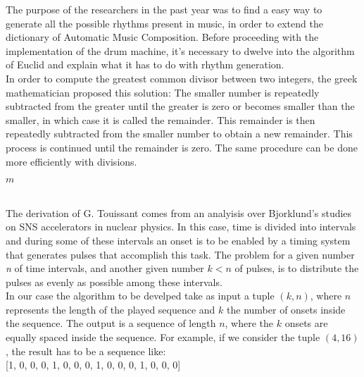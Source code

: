 \documentclass[main.tex]{subfiles}
\begin{document}
The purpose of the researchers in the past year was to find a easy way to generate all the possible rhythms present in music, in order to extend the dictionary of Automatic Music Composition\cite{Allouche:2002:AutomSeq:book}.
Before proceeding with the implementation of the drum machine, it’s necessary to dwelve into the algorithm of Euclid and explain what it has to do with rhythm generation.\\
In order to compute the greatest common divisor between two integers, the greek mathematician proposed this solution:
The smaller number is repeatedly subtracted from the greater until the greater is zero or becomes smaller than the smaller, in which case it is called the remainder. This remainder is then repeatedly subtracted from the smaller number to obtain a new remainder. This process is continued until the remainder is zero\cite{Euclid:Elements}. 
The same procedure can be done more efficiently with divisions.\\
[2mm]
\begin{algorithm}
\label{euclid}
\begin{algorithmic}[1]
\State \Return $m$
\Else
\State {}

\EndIf
\EndProcedure
\end{algorithmic}
\end{algorithm}\\
[3mm]
The derivation of G. Touissant\cite{Toussaint:2004:euclidean:rhythm} comes from an analyisis over Bjorklund's studies on SNS accelerators\cite{Bjorklund:2004:euclidean:rhythm} in nuclear physics. In this case, time is divided into intervals and during some of these intervals an onset is to be enabled by a timing system that generates pulses that accomplish this task. The problem for a given number \textit{n} of time intervals, and another given number \begin{math}k<n\end{math} of pulses, is to distribute the pulses as evenly as possible among these intervals.\\
In our case the algorithm to be develped take as input a tuple \begin{math}{(k, n)}\end{math}, where \begin{math}{n}\end{math} represents the length of the played sequence and \begin{math}{k}\end{math} the number of onsets inside the sequence. The output is a sequence of length \begin{math}{n}\end{math}, where the \begin{math}{k}\end{math} onsets are equally spaced inside the sequence. For example, if we consider the tuple \begin{math}{(4, 16)}\end{math}, the result has to be a sequence like:\\
[2mm]
[1, 0, 0, 0, 1, 0, 0, 0, 1, 0, 0, 0, 1, 0, 0, 0]\\
[3mm]
\end{document}
